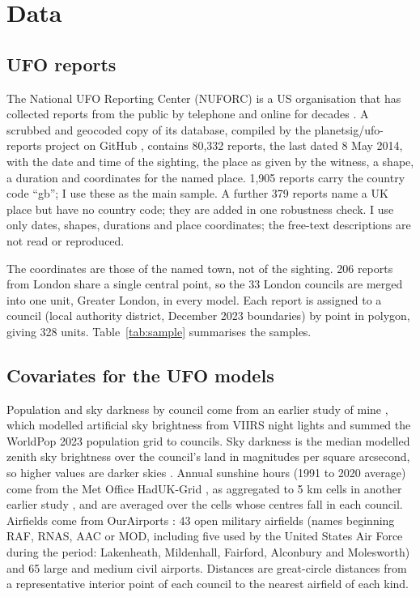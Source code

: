 \documentclass[11pt,a4paper]{article}
\begin{document}
\section{Data}\label{sec:data}
\subsection{UFO reports}
The National UFO Reporting Center (NUFORC) is a US organisation that has collected reports from the public by telephone and online for decades \citep{nuforc2026}. A scrubbed and geocoded copy of its database, compiled by the planetsig/ufo-reports project on GitHub \citep{planetsig}, contains 80,332 reports, the last dated 8 May 2014, with the date and time of the sighting, the place as given by the witness, a shape, a duration and coordinates for the named place. 1,905 reports carry the country code ``gb''; I use these as the main sample. A further 379 reports name a UK place but have no country code; they are added in one robustness check. I use only dates, shapes, durations and place coordinates; the free-text descriptions are not read or reproduced.

The coordinates are those of the named town, not of the sighting. 206 reports from London share a single central point, so the 33 London councils are merged into one unit, Greater London, in every model. Each report is assigned to a council (local authority district, December 2023 boundaries) by point in polygon, giving 328 units. Table~\ref{tab:sample} summarises the samples.

\subsection{Covariates for the UFO models}
Population and sky darkness by council come from an earlier study of mine \citep{hotham2026dark}, which modelled artificial sky brightness from VIIRS night lights and summed the WorldPop 2023 population grid \citep{bondarenko2025} to councils. Sky darkness is the median modelled zenith sky brightness over the council's land in magnitudes per square arcsecond, so higher values are darker skies \citep{falchi2016}. Annual sunshine hours (1991 to 2020 average) come from the Met Office HadUK-Grid \citep{hollis2026}, as aggregated to 5 km cells in another earlier study \citep{hotham2026sun}, and are averaged over the cells whose centres fall in each council. Airfields come from OurAirports \citep{ourairports2026}: 43 open military airfields (names beginning RAF, RNAS, AAC or MOD, including five used by the United States Air Force during the period: Lakenheath, Mildenhall, Fairford, Alconbury and Molesworth) and 65 large and medium civil airports. Distances are great-circle distances from a representative interior point of each council to the nearest airfield of each kind.
\end{document}
